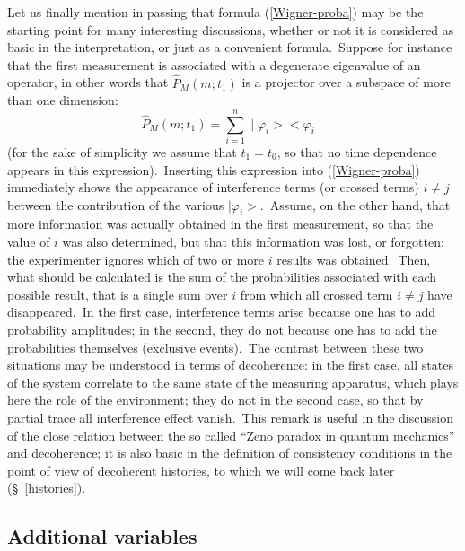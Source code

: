 \documentclass[12pt,onecolumn]{article}%
\begin{document}
Let us finally mention in passing that formula (\ref{Wigner-proba}) may be the
starting point for many interesting discussions, whether or not it is
considered as basic in the interpretation, or just as a convenient
formula.\ Suppose for instance that the first measurement is associated with a
degenerate eigenvalue of an operator, in other words that $\widehat{P}%
_{M}(m;t_{1})$ is a projector over a subspace of more than one dimension:%
\begin{equation}
\widehat{P}_{M}(m;t_{1})=\sum_{i=1}^{n}\mid\varphi_{i}><\varphi_{i}%
\mid\label{proj}%
\end{equation}
(for the sake of simplicity we assume that $t_{1}=t_{0}$, so that no time
dependence appears in this expression).\ Inserting this expression into
(\ref{Wigner-proba}) immediately shows the appearance of interference terms
(or crossed terms) $i\neq j$ between the contribution of the various
$\mid\varphi_{i}>$.\ Assume, on the other hand, that more information was
actually obtained in the first measurement, so that the value of $i$ was also
determined, but that this information was lost, or forgotten; the experimenter
ignores which of two or more $i$ results was obtained.\ Then, what should be
calculated is the sum of the probabilities associated with each possible
result, that is a single sum over $i$ from which all crossed term $i\neq j$
have disappeared.\ In the first case, interference terms arise because one has
to add probability amplitudes; in the second, they do not because one has to
add the probabilities themselves (exclusive events).\ The contrast between
these two situations may be understood in terms of decoherence: in the first
case, all states of the system correlate to the same state of the measuring
apparatus, which plays here the role of the environment; they do not in the
second case, so that by partial trace all interference effect vanish.\ This
remark is useful in the discussion of the close relation between the so called
``Zeno paradox in quantum mechanics'' \cite{Zeno} and decoherence; it is also
basic in the definition of consistency conditions in the point of view of
decoherent histories, to which we will come back later (\S \ \ref{histories}).

\subsection{Additional variables}

\label{additional}
\end{document}
